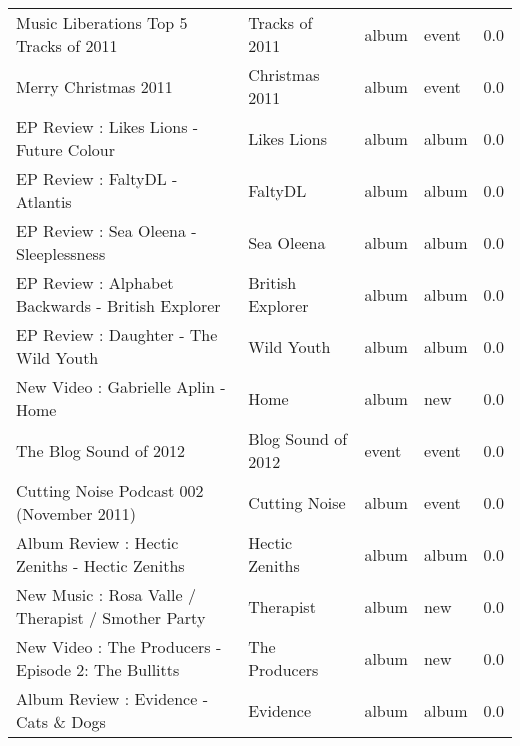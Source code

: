 \begin{tabular}{ l l l l l }
\tiny Music Liberations Top 5 Tracks of 2011& \tiny Tracks of 2011& \tiny album& \tiny event& \tiny 0.0\\ 
\tiny Merry Christmas 2011& \tiny Christmas 2011& \tiny album& \tiny event& \tiny 0.0\\ 
\tiny EP Review : Likes Lions - Future Colour& \tiny Likes Lions& \tiny album& \tiny album& \tiny 0.0\\ 
\tiny EP Review : FaltyDL - Atlantis& \tiny FaltyDL& \tiny album& \tiny album& \tiny 0.0\\ 
\tiny EP Review : Sea Oleena - Sleeplessness& \tiny Sea Oleena& \tiny album& \tiny album& \tiny 0.0\\ 
\tiny EP Review : Alphabet Backwards - British Explorer& \tiny British Explorer& \tiny album& \tiny album& \tiny 0.0\\ 
\tiny EP Review : Daughter - The Wild Youth& \tiny Wild Youth& \tiny album& \tiny album& \tiny 0.0\\ 
\tiny New Video : Gabrielle Aplin - Home& \tiny Home& \tiny album& \tiny new& \tiny 0.0\\ 
\tiny The Blog Sound of 2012& \tiny Blog Sound of 2012& \tiny event& \tiny event& \tiny 0.0\\ 
\tiny Cutting Noise Podcast 002 (November 2011)& \tiny Cutting Noise& \tiny album& \tiny event& \tiny 0.0\\ 
\tiny Album Review : Hectic Zeniths - Hectic Zeniths& \tiny Hectic Zeniths& \tiny album& \tiny album& \tiny 0.0\\ 
\tiny New Music : Rosa Valle / Therapist / Smother Party& \tiny Therapist& \tiny album& \tiny new& \tiny 0.0\\ 
\tiny New Video : The Producers - Episode 2: The Bullitts& \tiny The Producers& \tiny album& \tiny new& \tiny 0.0\\ 
\tiny Album Review : Evidence - Cats \& Dogs& \tiny Evidence& \tiny album& \tiny album& \tiny 0.0\\ 
\end{tabular}

